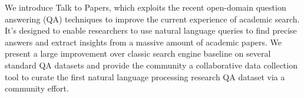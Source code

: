 We introduce Talk to Papers, which exploits the recent open-domain question answering (QA) techniques to improve the current experience of academic search. It's designed to enable researchers to use natural language queries to find precise answers and extract insights from a massive amount of academic papers. We present a large improvement over classic search engine baseline on several standard QA datasets and provide the community a collaborative data collection tool to curate the first natural language processing research QA dataset via a community effort.
